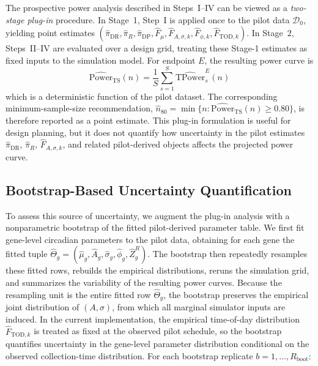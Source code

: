 \documentclass{article}
\begin{document}
The prospective power analysis described in Steps~I--IV can be viewed as a
\emph{two-stage plug-in} procedure. In Stage~1, Step~I is applied once to the
pilot data $\mathcal{D}_0$, yielding point estimates
$(\hat{\pi}_{\mathrm{DR}},\hat{\pi}_R,\hat{\pi}_{\mathrm{DP}},
\hat{F}_{\mu},\hat{F}_{A,\sigma,k},\hat{F}_{\phi,k},\hat{F}_{\mathrm{TOD},k})$.
In Stage~2, Steps~II--IV are evaluated over a design grid, treating these
Stage-1 estimates as fixed inputs to the simulation model. For endpoint $E$,
the resulting power
curve is
\begin{equation}
\widehat{\mathrm{Power}}_{\mathrm{TS}}(n)
=
\frac{1}{S}\sum_{s=1}^{S}\widehat{\mathrm{TPower}}_s^{E}(n)
\label{eq:two_stage_power}
\end{equation}
which is a deterministic function of the pilot dataset. The corresponding
minimum-sample-size recommendation,
\(\hat{n}_{80}=\min\!\{n:\widehat{\mathrm{Power}}_{\mathrm{TS}}(n)\geq 0.80\}\),
is therefore reported as a point estimate. This plug-in formulation is useful
for design planning, but it does not quantify how uncertainty in the pilot
estimates $\hat{\pi}_{\mathrm{DR}}$, $\hat{\pi}_R$,
$\hat{F}_{A,\sigma,k}$, and related pilot-derived objects affects the projected
power curve.

\subsection{Bootstrap-Based Uncertainty Quantification}
\label{sec:bootstrap}

To assess this source of uncertainty, we augment the plug-in analysis with a
nonparametric bootstrap of the fitted pilot-derived parameter table. We first
fit gene-level circadian parameters to the pilot data, obtaining for each gene
the fitted tuple
$\hat{\Theta}_g=(\hat{\mu}_g,\hat{A}_g,\hat{\sigma}_g,\hat{\phi}_g,\hat{Z}_g^R)$.
The bootstrap then repeatedly resamples these fitted rows, rebuilds the
empirical distributions, reruns the simulation grid, and summarizes the
variability of the resulting power curves. Because the resampling unit is the entire fitted row $\hat{\Theta}_g$,
the bootstrap preserves the empirical joint distribution of $(A,\sigma)$,
from which all marginal simulator inputs are induced. In the current
implementation, the empirical time-of-day distribution
$\hat{F}_{\mathrm{TOD},k}$ is treated as fixed at the observed pilot schedule,
so the bootstrap quantifies uncertainty in the gene-level parameter
distribution conditional on the observed collection-time distribution.
For each bootstrap replicate
$b=1,\ldots,R_{\mathrm{boot}}$:
\end{document}
